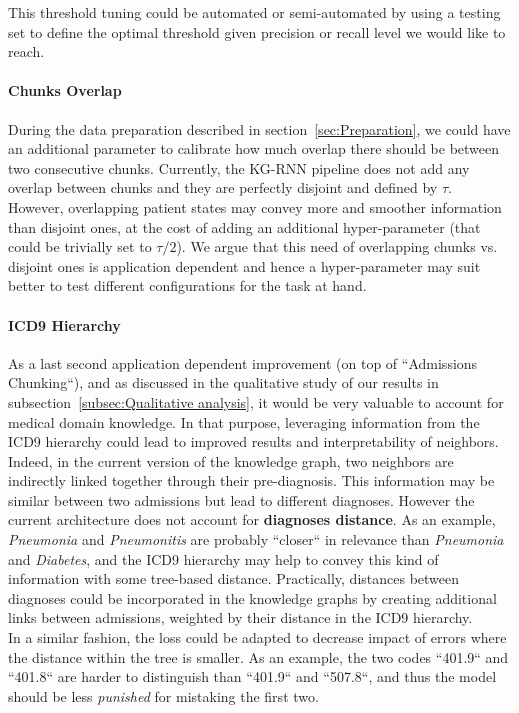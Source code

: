 This threshold tuning could be automated or semi-automated by using a testing set to define the optimal threshold given precision or recall level we would like to reach.

\paragraph{Chunks Overlap}
During the data preparation described in section~\ref{sec:Preparation}, we could have an additional parameter to calibrate how much overlap there should be between two consecutive chunks. Currently, the KG-RNN pipeline does not add any overlap between chunks and they are perfectly disjoint and defined by $\tau$. \\

However, overlapping patient states may convey more and smoother information than disjoint ones, at the cost of adding an additional hyper-parameter (that could be trivially set to $\tau/2$). We argue that this need of overlapping chunks vs. disjoint ones is application dependent and hence a hyper-parameter may suit better to test different configurations for the task at hand.

\paragraph{ICD9 Hierarchy}
As a last second application dependent improvement (on top of ``Admissions Chunking``), and as discussed in the qualitative study of our results in subsection~\ref{subsec:Qualitative analysis}, it would be very valuable to account for medical domain knowledge. In that purpose, leveraging information from the ICD9 hierarchy could lead to improved results and interpretability of neighbors. \\

Indeed, in the current version of the knowledge graph, two neighbors are indirectly linked together through their pre-diagnosis. This information may be similar between two admissions but lead to different diagnoses. However the current architecture does not account for \textbf{diagnoses distance}. As an example, \textit{Pneumonia} and \textit{Pneumonitis} are probably ``closer`` in relevance than \textit{Pneumonia} and \textit{Diabetes}, and the ICD9 hierarchy may help to convey this kind of information with some tree-based distance. Practically, distances between diagnoses could be incorporated in the knowledge graphs by creating additional links between admissions, weighted by their distance in the ICD9 hierarchy. \\

In a similar fashion, the loss could be adapted to decrease impact of errors where the distance within the tree is smaller. As an example, the two codes ``401.9`` and  ``401.8`` are harder to distinguish than ``401.9`` and ``507.8``, and thus the model should be less \textit{punished} for mistaking the first two.